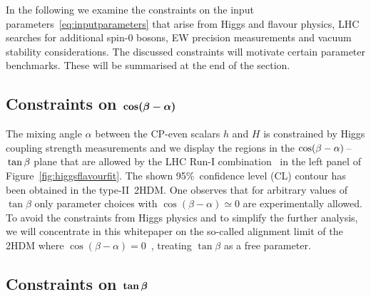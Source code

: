 \documentclass[a4paper, 11pt,notoc]{article}
\def\bm#1{\mbox{\boldmath$#1$\unboldmath}}
\begin{document}
In the following we examine the constraints on the input parameters~\eqref{eq:inputparameters} that arise from Higgs and flavour physics, LHC searches for additional {\color{red} spin-0 bosons}, EW precision measurements and vacuum stability considerations. The discussed constraints will motivate certain parameter benchmarks. These will be summarised at the end of the section. 

\subsection*{Constraints on $\bm{\cos (\beta - \alpha)}$}

The mixing angle $\alpha$ between the CP-even scalars $h$ and $H$ is constrained by Higgs coupling strength measurements and we display the regions in the $\cos(\beta-\alpha)\hspace{0.5mm}$--$\hspace{0.5mm}\tan\beta$ plane that are allowed by the LHC Run-I combination~\cite{Khachatryan:2016vau} in  the left panel of Figure~\ref{fig:higgsflavourfit}. The shown 95\%~confidence level (CL) contour has been obtained in the type-II~2HDM. One observes that for arbitrary values of $\tan \beta$ only parameter choices with $\cos(\beta-\alpha) \simeq 0$ are experimentally allowed.  To avoid the constraints from Higgs physics and to simplify the further analysis, we will concentrate in this whitepaper on the so-called alignment limit of the 2HDM where $\cos (\beta - \alpha) = 0$~\cite{Gunion:2002zf}, treating $\tan \beta$ as a free parameter.

\subsection*{Constraints on $\bm{\tan \beta}$}
\end{document}
